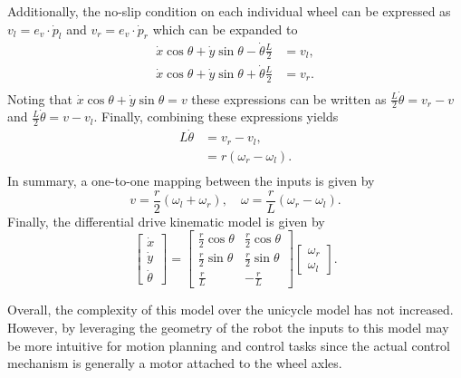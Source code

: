Additionally, the no-slip condition on each individual wheel can be expressed as $v_l = e_v \cdot \dot{p}_l$ and $v_r = e_v \cdot \dot{p}_r$ which can be expanded to
\begin{equation*}
\begin{split}
\dot{x}\cos{\theta} + \dot{y}\sin{\theta} - \dot{\theta} \frac{L}{2} &= v_l, \\
\dot{x}\cos{\theta} + \dot{y}\sin{\theta} + \dot{\theta} \frac{L}{2} &= v_r. \\
\end{split}
\end{equation*}
Noting that $\dot{x}\cos{\theta} + \dot{y}\sin{\theta} = v$ these expressions can be written as $\frac{L}{2}\dot{\theta} = v_r - v$ and $\frac{L}{2}\dot{\theta} = v - v_l$. Finally, combining these expressions yields
\begin{equation*}
\begin{split}
L\dot{\theta} &= v_r - v_l, \\
&= r(\omega_r - \omega_l). \\
\end{split}
\end{equation*}
In summary, a one-to-one mapping between the inputs is given by
\begin{equation*}
v = \frac{r}{2}(\omega_l + \omega_r), \quad \omega = \frac{r}{L}(\omega_r - \omega_l).
\end{equation*}
Finally, the differential drive kinematic model is given by
\begin{equation} \label{eq:dd}
\begin{bmatrix}
\dot{x} \\ \dot{y} \\ \dot{\theta} 
\end{bmatrix}
 = 
 \begin{bmatrix}
\frac{r}{2}\cos\theta & \frac{r}{2}\cos\theta \\ 
\frac{r}{2}\sin\theta & \frac{r}{2}\sin\theta \\ 
\frac{r}{L} & -\frac{r}{L}
\end{bmatrix}
\begin{bmatrix}
\omega_r \\ \omega_l
\end{bmatrix}.
\end{equation}

Overall, the complexity of this model over the unicycle model has not increased. However, by leveraging the geometry of the robot the inputs to this model may be more intuitive for motion planning and control tasks since the actual control mechanism is generally a motor attached to the wheel axles. 

